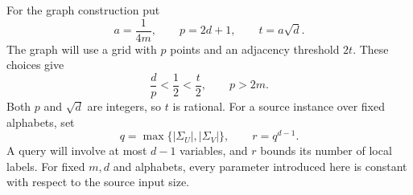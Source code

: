 For the graph construction put
\begin{equation}
 a=\frac1{4m},\qquad p=2d+1,\qquad t=a\sqrt d.
 \label{src:construction-parameters}
\end{equation}
The graph will use a grid with \(p\) points and an adjacency threshold
\(2t\). These choices give
\[
 \frac dp<\frac12<\frac t2,\qquad p>2m.
\]
Both \(p\) and \(\sqrt d\) are integers, so \(t\) is rational.
For a source instance over fixed alphabets, set
\[
 q=\max\{|\Sigma_U|,|\Sigma_V|\},\qquad r=q^{d-1}.
\]
A query will involve at most \(d-1\) variables, and \(r\) bounds
its number of local labels. For fixed \(m,d\) and alphabets, every
parameter introduced here is constant with respect to the source
input size.
